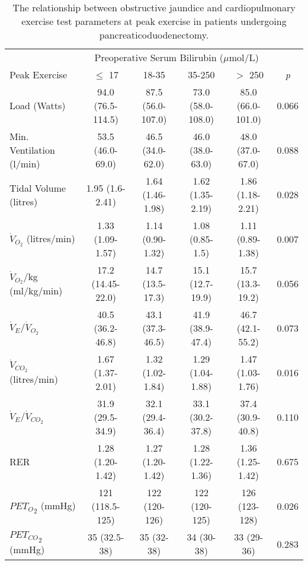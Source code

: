 \begin{sidewaystable}[p]
	\caption{The relationship  between obstructive jaundice and cardiopulmonary exercise test parameters at peak exercise in patients undergoing pancreaticoduodenectomy.  }
	\label{table:cpet_oj_peak}
	\centering
	\renewcommand{\arraystretch}{1.4} %
	\begin{tabular}{|l| c c c c c|}
		\hline
		                               &         \multicolumn{4}{c}{Preoperative Serum Bilirubin ($\mu$mol/L)}          &  \\
		Peak Exercise                  & $\leq$ 17         & 18-35             & 35-250            & $>$ 250            & \textit{p} \\ \hline
		Load  (Watts)                  & 94.0 (76.5-114.5) & 87.5 (56.0-107.0) & 73.0 (58.0-108.0) & 85.0 (66.0-101.0)  & 0.066      \\
		Min. Ventilation (l/min)       & 53.5 (46.0-69.0)  & 46.5 (34.0-62.0)  & 46.0 (38.0-63.0)  & 48.0 (37.0-67.0)   & 0.088      \\
		Tidal Volume (litres)          & 1.95 (1.6-2.41)   & 1.64 (1.46-1.98)  & 1.62 (1.35-2.19)  & 1.86 (1.18-2.21)   & 0.028      \\
		$\dot{V}_{O_2}$ (litres/min)   & 1.33 (1.09-1.57)  & 1.14 (0.90-1.32)  & 1.08 (0.85-1.5)   & 1.11 (0.89-1.38)   & 0.007      \\
		$\dot{V}_{O_2}$/kg (ml/kg/min) & 17.2 (14.45-22.0) & 14.7 (13.5-17.3)  & 15.1 (12.7-19.9)  & 15.7 (13.3-19.2)   & 0.056      \\
		$\dot{V}_E/\dot{V}_{O_2}$      & 40.5 (36.2-46.8)  & 43.1 (37.3-46.5)  & 41.9 (38.9-47.4)  & 46.7 (42.1-55.2)   & 0.073      \\
		$\dot{V}_{CO_2}$ (litres/min)  & 1.67 (1.37-2.01)  & 1.32 (1.02-1.84)  & 1.29 (1.04-1.88)  & 1.47 (1.03-1.76)   & 0.016      \\
		$\dot{V}_E/\dot{V}_{CO_2}$     & 31.9 (29.5-34.9)  & 32.1 (29.4-36.4)  & 33.1 (30.2-37.8)  & 37.4 (30.9-40.8)   & 0.110      \\
		RER                            & 1.28 (1.20-1.42)  & 1.27 (1.20-1.42)  & 1.28 (1.22-1.36)  & 1.36 (1.25-1.42)   & 0.675      \\
		${PET_O}_2$ (mmHg)             & 121 (118.5-125)   & 122 (120-126)     & 122 (120-125)     & 126 (123-128)      & 0.026      \\
		${PET_{CO}}_2$ (mmHg)          & 35 (32.5-38)      & 35 (32-38)        & 34 (30-38)        & 33 (29-36)         & 0.283      \\

\end{tabular}
\end{sidewaystable}
